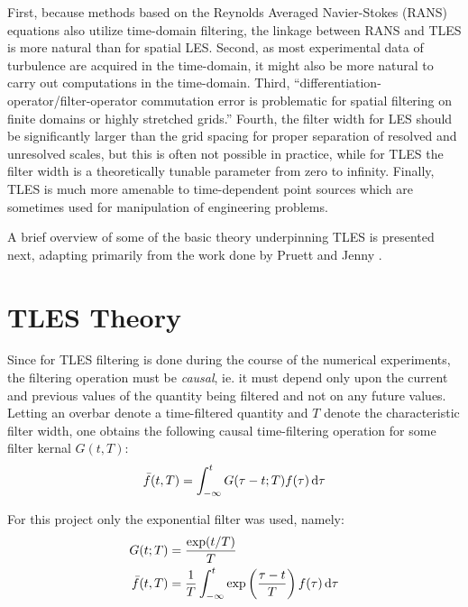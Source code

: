 First, because methods based on the Reynolds Averaged Navier-Stokes (RANS) equations also utilize time-domain filtering, the linkage between RANS and TLES is more natural than for spatial LES. Second, as most experimental data of turbulence are acquired in the time-domain, it might also be more natural to carry out computations in the time-domain. Third, ``differentiation-operator/filter-operator commutation error is problematic for spatial filtering on finite domains or highly stretched grids.''\cite{Pruett2008} Fourth, the filter width for LES should be significantly larger than the grid spacing for proper separation of resolved and unresolved scales, but this is often not possible in practice, while for TLES the filter width is a theoretically tunable parameter from zero to infinity. Finally, TLES is much more amenable to time-dependent point sources which are sometimes used for manipulation of engineering problems.

A brief overview of some of the basic theory underpinning TLES is presented next, adapting primarily from the work done by Pruett \cite{Pruett2008} and Jenny \cite{Jenny2016}.

\section{TLES Theory} \label{sec:TLES}

Since for TLES filtering is done during the course of the numerical experiments, the filtering operation must be \emph{causal}, ie. it must depend only upon the current and previous values of the quantity being filtered and not on any future values. Letting an overbar denote a time-filtered quantity and $T$ denote the characteristic filter width, one obtains the following causal time-filtering operation for some filter kernal $G(t,T)$:
\begin{equation}
\bar{f}(t,T)=\int_{-\infty}^{t}G(\tau -t;T)f(\tau)\mathop{}\!\mathrm{d}\tau
\end{equation}

For this project only the exponential filter was used, namely:
\begin{equation}
\begin{split}
G(t;T)&=\frac{\exp(t/T)}{T} \\
\bar{f}(t,T)&=\frac{1}{T}\int_{-\infty}^{t}\exp\left(\frac{\tau-t}{T}\right)f(\tau)\mathop{}\!\mathrm{d}\tau
\end{split}
\end{equation}

